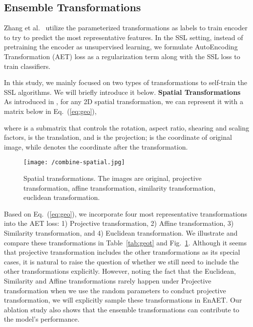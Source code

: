 \documentclass[journal]{IEEEtran}
\begin{document}
\subsection{Ensemble Transformations}
\label{sec:aet}

\par Zhang et al.~\cite{zhang2019aet} utilize the parameterized transformations as labels to train encoder to try to predict the most representative features. In the SSL setting, instead of pretraining the encoder as unsupervised learning, we formulate AutoEncoding Transformation (AET) loss as a regularization term along with the SSL loss to train classifiers.
\par In this study, we mainly focused on two types of transformations to self-train the SSL algorithms. We will briefly introduce it below.
{\noindent\bf Spatial Transformations} As introduced in \cite{hartley1999theory}, for any 2D spatial transformation, we can represent it with a matrix below in Eq.~(\ref{eq:geo}),

where  is a submatrix that controls the rotation, aspect ratio, shearing and scaling factors,  is the translation, and  is the projection;  is the coordinate of original image, while  denotes the  coordinate after the transformation.
\begin{figure}[t]

\centering
\texttt{[image: /combine-spatial.jpg]}
\caption{Spatial transformations. The images are original, projective transformation, affine transformation, similarity transformation, euclidean transformation.}
\label{fig:figspatial}
\end{figure}
\par Based on Eq.~(\ref{eq:geo}), we incorporate four most representative transformations into the AET loss: 1) Projective transformation, 2) Affine transformation, 3) Similarity transformation, and 4) Euclidean transformation.  We illustrate and compare these transformations in Table~\ref{tab:geot} and Fig.~\ref{fig:figspatial}.  Although it seems that projective transformation includes the other transformations as its special cases, it is natural to raise the question of whether we still need to include the other transformations explicitly. However, noting the fact that the Euclidean, Similarity and Affine transformations rarely happen under Projective transformation when we use the random parameters to conduct projective transformation, we will explicitly sample these transformations in EnAET. Our ablation study also shows that the ensemble transformations can contribute to the model's performance.
\end{document}
